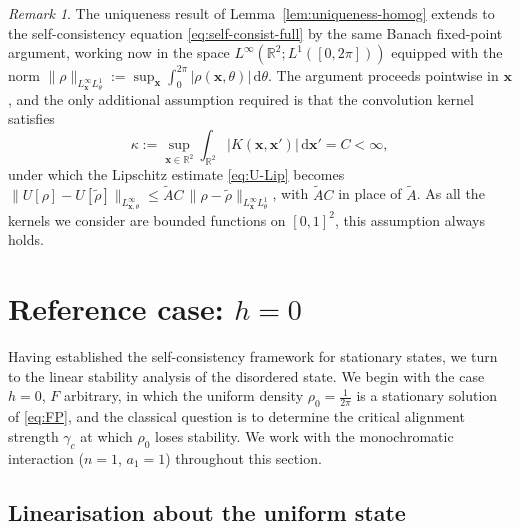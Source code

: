 \documentclass[a4paper,11pt]{article}
\theoremstyle{plain}
\theoremstyle{definition}
\theoremstyle{remark}
\newtheorem{rem}[thm]{Remark}
\begin{document}
\begin{rem}
The uniqueness result of Lemma~\ref{lem:uniqueness-homog} extends to the self-consistency equation \eqref{eq:self-consist-full} by the same Banach fixed-point argument, working now in the space $L^\infty(\mathbb{R}^2;L^1([0,2\pi]))$ equipped with the norm $\|\rho\|_{L^\infty_\mathbf{x} L^1_\theta} := \sup_{\mathbf{x}}\int_0^{2\pi}|\rho(\mathbf{x},\theta)|\,\mathrm{d}\theta$. The argument proceeds pointwise in $\mathbf{x}$, and the only additional assumption required is that the convolution kernel satisfies
\[
    \kappa := \sup_{\mathbf{x}\in\mathbb{R}^2}\int_{\mathbb{R}^2}|K(\mathbf{x},\mathbf{x}')|\,\mathrm{d}\mathbf{x}' = C < \infty,
\]
under which the Lipschitz estimate \eqref{eq:U-Lip} becomes $\|U[\rho]-U[\tilde\rho]\|_{L^\infty_{\mathbf{x},\theta}} \leq \tilde{A}C \,\|\rho-\tilde\rho\|_{L^\infty_\mathbf{x} L^1_\theta}$, with $\tilde{A}C$ in place of $\tilde{A}$. As all the kernels we consider are bounded functions on $[0,1]^2$, this assumption always holds.
\end{rem}

\section{Reference case: $h=0$}\label{sec:h0}

Having established the self-consistency framework for stationary states, we turn to the linear stability analysis of the disordered state. We begin with the case $h=0$, $F$ arbitrary, in which the uniform density $\rho_0 = \frac{1}{2\pi}$ is a stationary solution of \eqref{eq:FP}, and the classical question is to determine the critical alignment strength $\gamma_c$ at which $\rho_0$ loses stability. We work with the monochromatic interaction ($n=1$, $a_1=1$) throughout this section.

\subsection{Linearisation about the uniform state}\label{subsec:linearisation}
\end{document}
